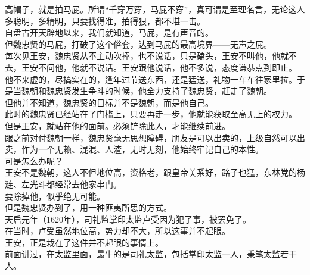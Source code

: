 \begin{multicols}{\theparacolNo}
高帽子，就是拍马屁。所谓“千穿万穿，马屁不穿”，真可谓是至理名言，无论这人多聪明，多精明，只要找得准，拍得狠，都不堪一击。\\

自盘古开天辟地以来，我们就知道，马屁，是有声音的。\\

但魏忠贤的马屁，打破了这个俗套，达到马屁的最高境界——无声之屁。\\

每次见王安，魏忠贤从不主动吹捧，也不说话，只是磕头，王安不叫他，他就不去，王安不问他，他就不说话。王安跟他说话，他不多说，态度谦恭点到即止。\\

他不来虚的，尽搞实在的，逢年过节送东西，还是猛送，礼物一车车往家里拉。于是当魏朝和魏忠贤发生争斗的时候，他全力支持了魏忠贤，赶走了魏朝。\\

但他并不知道，魏忠贤的目标并不是魏朝，而是他自己。\\

此时的魏忠贤已经站在了门槛上，只要再走一步，他就能获取至高无上的权力。\\

但是王安，就站在他的面前。必须铲除此人，才能继续前进。\\

跟之前对付魏朝一样，魏忠贤毫无思想障碍，朋友是可以出卖的，上级自然可以出卖，作为一个无赖、混混、人渣，无时无刻，他始终牢记自己的本性。\\

可是怎么办呢？\\

王安不是魏朝，这人不但地位高，资格老，跟皇帝关系好，路子也猛，东林党的杨涟、左光斗都经常去他家串门。\\

要除掉他，似乎绝无可能。\\

但是魏忠贤办到了，用一种匪夷所思的方式。\\

天启元年（1620年），司礼监掌印太监卢受因为犯了事，被罢免了。\\

在当时，卢受虽然地位高，势力却不大，所以这事并不起眼。\\

王安，正是栽在了这件并不起眼的事情上。\\

前面讲过，在太监里面，最牛的是司礼太监，包括掌印太监一人，秉笔太监若干人。\\


\end{multicols}

